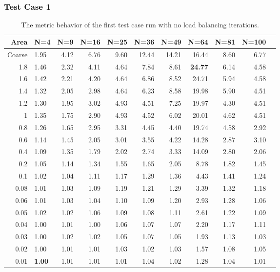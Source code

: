 \documentclass[]{beamer}
\begin{document}
\begin{frame}[t]\frametitle{Test Case 1}
\begin{table}[H]
\tiny
\centering
\caption{The metric behavior of the first test case run with no load balancing iterations.}
\begin{tabular}{rlrrrrrrrrr}
  \hline
 Area & N=4 & N=9 & N=16 & N=25 & N=36 & N=49 & N=64 & N=81 & N=100 \\ 
  \hline
 Coarse & 1.95 & 4.12 & 6.76 & 9.60 & 12.44 & 14.21 & 16.44 & 8.60 & 6.77 \\ 
   1.8 & 1.46 & 2.32 & 4.11 & 4.64 & 7.84 & 8.61 & \textbf{\cellcolor{blue!25}24.77} & 6.14 & 4.58 \\ 
 1.6 & 1.42 & 2.21 & 4.20 & 4.64 & 6.86 & 8.52 & 24.71 & 5.94 & 4.58 \\ 
 1.4 & 1.32 & 2.05 & 2.98 & 4.64 & 6.23 & 8.58 & 19.98 & 5.90 & 4.51 \\ 
 1.2 & 1.30 & 1.95 & 3.02 & 4.93 & 4.51 & 7.25 & 19.97 & 4.30 & 4.51 \\ 
  1 & 1.35 & 1.75 & 2.90 & 4.93 & 4.52 & 6.02 & 20.01 & 4.62 & 4.51 \\ 
  0.8 & 1.26 & 1.65 & 2.95 & 3.31 & 4.45 & 4.40 & 19.74 & 4.58 & 2.92 \\ 
   0.6 & 1.14 & 1.45 & 2.05 & 3.01 & 3.55 & 4.22 & 14.28 & 2.87 & 3.10 \\ 
 0.4 & 1.09 & 1.35 & 1.79 & 2.02 & 2.74 & 3.33 & 14.09 & 2.80 & 2.06 \\ 
   0.2 & 1.05 & 1.14 & 1.34 & 1.55 & 1.65 & 2.05 & 8.78 & 1.82 & 1.45 \\ 
  0.1 & 1.02 & 1.04 & 1.11 & 1.17 & 1.29 & 1.36 & 4.43 & 1.41 & 1.24 \\ 
  0.08 & 1.01 & 1.03 & 1.09 & 1.19 & 1.21 & 1.29 & 3.39 & 1.32 & 1.18 \\ 
 0.06 & 1.01 & 1.03 & 1.04 & 1.10 & 1.09 & 1.20 & 2.93 & 1.28 & 1.06 \\ 
  0.05 & 1.02 & 1.02 & 1.06 & 1.09 & 1.08 & 1.11 & 2.61 & 1.22 & 1.09 \\ 
   0.04 & 1.00 & 1.01 & 1.00 & 1.06 & 1.07 & 1.07 & 2.20 & 1.17 & 1.11 \\ 
  0.03 & 1.00 & 1.02 & 1.02 & 1.05 & 1.07 & 1.05 & 1.93 & 1.13 & 1.03 \\ 
   0.02 & 1.00 & 1.01 & 1.01 & 1.03 & 1.02 & 1.03 & 1.57 & 1.08 & 1.05 \\ 
  0.01 & \textbf{\cellcolor{blue!25}1.00} & 1.01 & 1.01 & 1.01 & 1.04 & 1.02 & 1.28 & 1.04 & 1.01 \\ 
   \hline
\end{tabular}
\end{table}
\end{frame}
\end{document}
